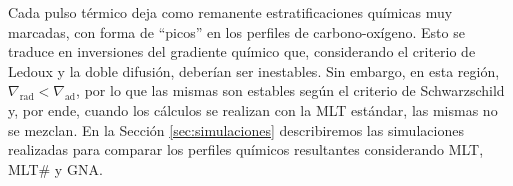 \documentclass[baaa]{baaa}
\begin{document}

Cada pulso térmico deja como remanente estratificaciones químicas muy marcadas, con forma de ``picos'' en los perfiles de carbono-oxígeno. Esto se traduce en inversiones del gradiente químico que, considerando el criterio de Ledoux y la doble difusión, deberían ser inestables. Sin embargo, en esta región, $\nabla_\text{rad}<\nabla_\text{ad}$, por lo que las mismas son estables según el criterio de Schwarzschild y, por ende, cuando los cálculos se realizan con la MLT estándar, las mismas no se mezclan.
En la Sección \ref{sec:simulaciones} describiremos las simulaciones realizadas para comparar los perfiles químicos resultantes considerando MLT, MLT\# y GNA.
\end{document}
